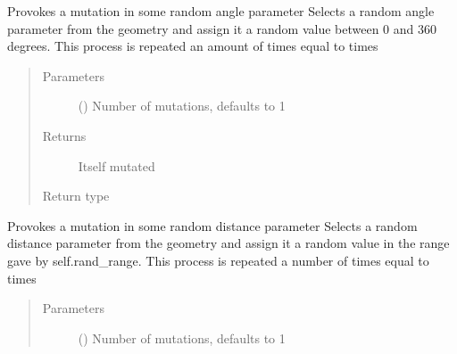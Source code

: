 \documentclass[letterpaper,10pt,english]{sphinxmanual}
\begin{document}
\begin{fulllineitems}
\begin{fulllineitems}
\end{fulllineitems}


\begin{fulllineitems}
\label{\detokenize{molecular:molecular.Molecule.mutate_angles}}
\sphinxAtStartPar
Provokes a mutation in some random angle parameter
Selects a random angle parameter from the geometry and assign it a random value between 0 and
360 degrees. This process is repeated an amount of times equal to times
\begin{quote}\begin{description}
\item[{Parameters}] \leavevmode
\sphinxAtStartPar
{} (\sphinxstyleliteralemphasis{\sphinxupquote{, }}) \textendash{} Number of mutations, defaults to 1

\item[{Returns}] \leavevmode
\sphinxAtStartPar
Itself mutated

\item[{Return type}] \leavevmode
\sphinxAtStartPar
{\hyperref[\detokenize{molecular:molecular.Molecule}]{}}

\end{description}\end{quote}

\end{fulllineitems}


\begin{fulllineitems}
\label{\detokenize{molecular:molecular.Molecule.mutate_distances}}
\sphinxAtStartPar
Provokes a mutation in some random distance parameter
Selects a random distance parameter from the geometry and assign it a random value in the range gave by
self.rand\_range. This process is repeated a number of times equal to times
\begin{quote}\begin{description}
\item[{Parameters}] \leavevmode
\sphinxAtStartPar
{} () \textendash{} Number of mutations, defaults to 1


\end{description}
\end{quote}
\end{fulllineitems}
\end{fulllineitems}
\end{document}
